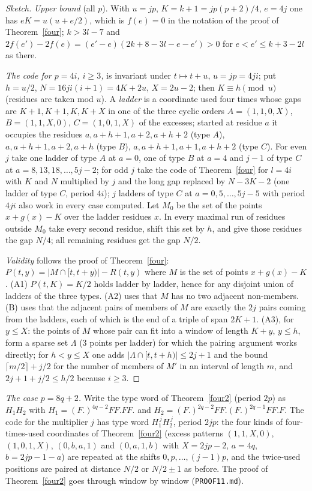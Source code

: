 \documentclass[11pt]{article}
\theoremstyle{remark}
\begin{document}
\begin{proof}[Sketch]
\emph{Upper bound} (all $p$). With $u=jp$, $K=k+1=jp(p+2)/4$, $e=4j$ one has $eK=u(u+e/2)$, which is $f(e)=0$ in the notation of the proof of
Theorem~\ref{four}; $k>3l-7$ and $2f(e')-2f(e)=(e'-e)(2k+8-3l-e-e')>0$ for $e<e'\le k+3-2l$ as there.

\emph{The code for $p=4i$, $i\ge 3$,} is invariant under $t\mapsto t+u$, $u=jp=4ji$; put $h=u/2$, $N=16ji(i+1)=4K+2u$, $X=2u-2$; then $K\equiv h\pmod u$
(residues are taken mod $u$).
A \emph{ladder} is a coordinate used four times whose gaps are $K+1,K+1,K,K+X$ in one of the three cyclic orders
$A=(1,1,0,X)$, $B=(1,1,X,0)$, $C=(1,0,1,X)$ of the excesses; started at residue $a$ it occupies the residues
$a,a+h+1,a+2,a+h+2$ (type $A$), $a,a+h+1,a+2,a+h$ (type $B$), $a,a+h+1,a+1,a+h+2$ (type $C$). For even $j$ take one ladder of
type $A$ at $a=0$, one of type $B$ at $a=4$ and $j-1$ of type $C$ at $a=8,13,18,\dots,5j-2$; for odd $j$ take the code of
Theorem~\ref{four} for $l=4i$ with $K$ and $N$ multiplied by $j$ and the long gap replaced by $N-3K-2$ (one ladder of type $C$,
period $4i$); $j$ ladders of type $C$ at $a=0,5,\dots,5j-5$ with period $4ji$ also work in every case computed.
Let $M_0$ be the set of the points $x+g(x)-K$ over the ladder residues $x$. In every maximal run of residues outside $M_0$ take
every second residue, shift this set by $h$, and give those residues the gap $N/4$; all remaining residues get the gap $N/2$.

\emph{Validity} follows the proof of Theorem~\ref{four}: $P(t,y)=|M\cap[t,t+y)|-R(t,y)$ where $M$ is the set of points
$x+g(x)-K$. (A1) $P(t,K)=K/2$ holds ladder by ladder, hence for any disjoint union of ladders of the three types. (A2) uses that $M$
has no two adjacent non-members. (B) uses that the adjacent pairs of members of $M$ are exactly the $2j$ pairs coming from the
ladders, each of which is the end of a triple of span $2K+1$. (A3), for $y\le X$: the points of $M$ whose pair can fit into a
window of length $K+y$, $y\le h$, form a sparse set $\Lambda$ ($3$ points per ladder) for which the pairing argument works
directly; for $h<y\le X$ one adds $|\Lambda\cap[t,t+h)|\le 2j+1$ and the bound $\lceil m/2\rceil+j/2$ for the number of members of
$M'$ in an interval of length $m$, and $2j+1+j/2\le h/2$ because $i\ge3$.
\end{proof}
\noindent\emph{The case $p=8q+2$.} Write the type word of Theorem~\ref{four2} (period $2p$) as $H_1H_2$ with
$H_1=(F.)^{4q-2}FF.FF.$ and $H_2=(F.)^{2q-2}FF.(F.)^{2q-1}FF.F.$ The code for the multiplier $j$ has type word $H_1^{\,j}H_2^{\,j}$,
period $2jp$: the four kinds of four-times-used coordinates of Theorem~\ref{four2} (excess patterns $(1,1,X,0)$, $(1,0,1,X)$,
$(0,b,a,1)$ and $(0,a,1,b)$ with $X=2jp-2$, $a=4q$, $b=2jp-1-a$) are repeated at the shifts $0,p,\dots,(j-1)p$, and the
twice-used positions are paired at distance $N/2$ or $N/2\pm1$ as before. The proof of Theorem~\ref{four2} goes through window by
window (\texttt{PROOF11.md}).
\end{document}
